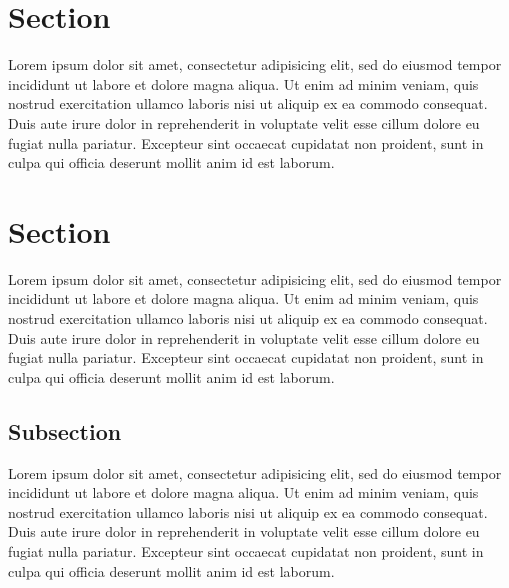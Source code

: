 \documentclass[a5paper, 10pt]{book}
\newcommand*\circled[1]{\tikz[baseline=(char.base)]{
            \node[shape=circle,draw,inner sep=0.2pt] (char) {#1};}}
\newcounter{mn}
\newcommand{\mnote}[1]{\refstepcounter{mn}\textsuperscript{\fontsize{6pt}{6pt}\selectfont\circled{\arabic{mn}}}\marginpar{\raggedright\fontsize{8pt}{8pt}\selectfont \textbf{\arabic{mn}:} \textcolor{gray}{#1}}}
\begin{document}
	\section{Section}

	Lorem ipsum dolor sit amet, consectetur adipisicing elit, sed do eiusmod tempor incididunt ut labore et dolore magna aliqua. Ut enim ad minim veniam, quis nostrud exercitation ullamco laboris nisi ut aliquip ex ea commodo\mnote{Hallo hier ist eine Randnote ! Lorem ipsum dolor sit amet, consectetur adipisicing elit, sed do eiusmod tempor incididunt ut labore et dolore magna aliqua. Ut enim ad minim veniam, quis nostrud exercitation ullamco laboris nisi ut aliquip ex ea commodo consequat. Duis aute irure dolor in reprehenderit in voluptate velit esse cillum dolore eu fugiat nulla pariatur. Excepteur sint occaecat cupidatat non proident, sunt in culpa qui officia deserunt mollit anim id est laborum.} consequat. Duis aute irure dolor in reprehenderit in voluptate velit esse cillum dolore eu fugiat nulla pariatur. Excepteur sint occaecat cupidatat non proident, sunt in culpa qui officia deserunt mollit anim id est laborum.

	\section{Section}

	Lorem ipsum dolor sit amet, consectetur adipisicing elit, sed do eiusmod tempor incididunt ut labore et dolore magna aliqua. Ut enim ad minim veniam, quis nostrud exercitation ullamco laboris nisi ut aliquip ex ea commodo consequat. Duis aute irure dolor in reprehenderit in voluptate velit esse cillum dolore eu fugiat nulla pariatur. Excepteur sint occaecat cupidatat non proident, sunt in culpa qui officia deserunt mollit anim id est laborum.

	\subsection{Subsection}

	Lorem ipsum dolor sit amet, consectetur adipisicing elit, sed do eiusmod tempor incididunt ut labore et dolore magna aliqua. Ut enim ad minim veniam, quis nostrud exercitation ullamco laboris nisi ut aliquip ex ea commodo consequat. Duis aute irure dolor in reprehenderit in voluptate velit esse cillum dolore eu fugiat nulla pariatur. Excepteur sint occaecat cupidatat non proident, sunt in culpa qui officia deserunt mollit anim id est laborum.
\end{document}
